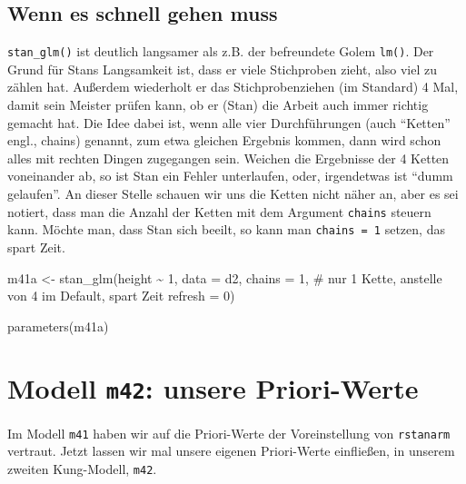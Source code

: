 \documentclass[
  a4paper,
  DIV=11]{scrreprt}
\newenvironment{Shaded}{\begin{snugshade}}{\end{snugshade}}
\newcommand{\AttributeTok}[1]{\textcolor[rgb]{0.40,0.45,0.13}{#1}}
\newcommand{\CommentTok}[1]{\textcolor[rgb]{0.37,0.37,0.37}{#1}}
\newcommand{\DecValTok}[1]{\textcolor[rgb]{0.68,0.00,0.00}{#1}}
\newcommand{\FunctionTok}[1]{\textcolor[rgb]{0.28,0.35,0.67}{#1}}
\newcommand{\NormalTok}[1]{\textcolor[rgb]{0.00,0.23,0.31}{#1}}
\newcommand{\OtherTok}[1]{\textcolor[rgb]{0.00,0.23,0.31}{#1}}
\newcommand{\SpecialCharTok}[1]{\textcolor[rgb]{0.37,0.37,0.37}{#1}}
\theoremstyle{definition}
\theoremstyle{remark}
\begin{document}
\hypertarget{wenn-es-schnell-gehen-muss}{%
\subsection{Wenn es schnell gehen
muss}\label{wenn-es-schnell-gehen-muss}}

\texttt{stan\_glm()} ist deutlich langsamer als z.B. der befreundete
Golem \texttt{lm()}. Der Grund für Stans Langsamkeit ist, dass er viele
Stichproben zieht, also viel zu zählen hat. Außerdem wiederholt er das
Stichprobenziehen (im Standard) 4 Mal, damit sein Meister prüfen kann,
ob er (Stan) die Arbeit auch immer richtig gemacht hat. Die Idee dabei
ist, wenn alle vier Durchführungen (auch ``Ketten'' engl., chains)
genannt, zum etwa gleichen Ergebnis kommen, dann wird schon alles mit
rechten Dingen zugegangen sein. Weichen die Ergebnisse der 4 Ketten
voneinander ab, so ist Stan ein Fehler unterlaufen, oder, irgendetwas
ist ``dumm gelaufen''. An dieser Stelle schauen wir uns die Ketten nicht
näher an, aber es sei notiert, dass man die Anzahl der Ketten mit dem
Argument \texttt{chains} steuern kann. Möchte man, dass Stan sich
beeilt, so kann man \texttt{chains\ =\ 1} setzen, das spart Zeit.

\begin{Shaded}
\begin{Highlighting}[]
\NormalTok{m41a }\OtherTok{\textless{}{-}} \FunctionTok{stan\_glm}\NormalTok{(height }\SpecialCharTok{\textasciitilde{}} \DecValTok{1}\NormalTok{, }
                 \AttributeTok{data =}\NormalTok{ d2, }
                 \AttributeTok{chains =} \DecValTok{1}\NormalTok{,  }\CommentTok{\# nur 1 Kette, anstelle von 4 im Default, spart Zeit}
                 \AttributeTok{refresh =} \DecValTok{0}\NormalTok{) }

\FunctionTok{parameters}\NormalTok{(m41a)  }
\end{Highlighting}
\end{Shaded}

\hypertarget{modell-m42-unsere-priori-werte}{%
\section{\texorpdfstring{Modell \texttt{m42}: unsere
Priori-Werte}{Modell m42: unsere Priori-Werte}}\label{modell-m42-unsere-priori-werte}}

Im Modell \texttt{m41} haben wir auf die Priori-Werte der Voreinstellung
von \texttt{rstanarm} vertraut. Jetzt lassen wir mal unsere eigenen
Priori-Werte einfließen, in unserem zweiten Kung-Modell, \texttt{m42}.
\end{document}
